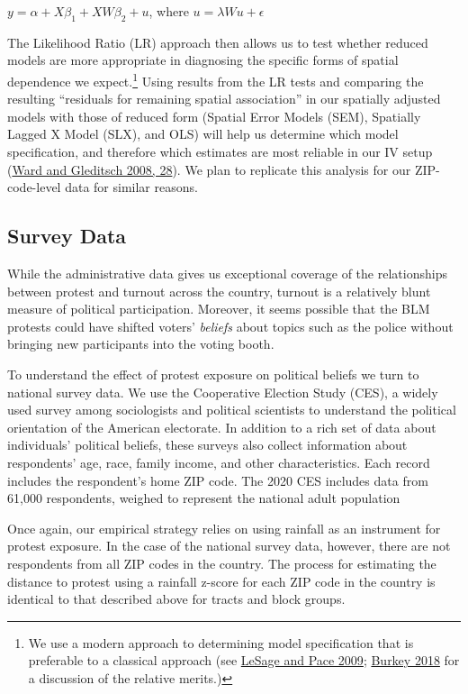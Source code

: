 \documentclass[
  12pt,
]{article}
\begin{document}
\(y = \alpha{} + X\beta_1{} + XW\beta_2{} + u\), where \(u = \lambda{Wu} + \epsilon{}\)

The Likelihood Ratio (LR) approach then allows us to test whether reduced models are more appropriate in diagnosing the specific forms of spatial dependence we expect.\footnote{We use a modern approach to determining model specification that is preferable to a classical approach (see \protect\hyperlink{ref-LeSage2009}{LeSage and Pace 2009}; \protect\hyperlink{ref-Burkey2018}{Burkey 2018} for a discussion of the relative merits.)} Using results from the LR tests and comparing the resulting ``residuals for remaining spatial association'' in our spatially adjusted models with those of reduced form (Spatial Error Models (SEM), Spatially Lagged X Model (SLX), and OLS) will help us determine which model specification, and therefore which estimates are most reliable in our IV setup (\protect\hyperlink{ref-Ward2008}{Ward and Gleditsch 2008, 28}). We plan to replicate this analysis for our ZIP-code-level data for similar reasons.

\hypertarget{survey-data}{%
\subsection*{Survey Data}\label{survey-data}}

While the administrative data gives us exceptional coverage of the relationships between protest and turnout across the country, turnout is a relatively blunt measure of political participation. Moreover, it seems possible that the BLM protests could have shifted voters' \emph{beliefs} about topics such as the police without bringing new participants into the voting booth.

To understand the effect of protest exposure on political beliefs we turn to national survey data. We use the Cooperative Election Study (CES), a widely used survey among sociologists and political scientists to understand the political orientation of the American electorate. In addition to a rich set of data about individuals' political beliefs, these surveys also collect information about respondents' age, race, family income, and other characteristics. Each record includes the respondent's home ZIP code. The 2020 CES includes data from 61,000 respondents, weighed to represent the national adult population

Once again, our empirical strategy relies on using rainfall as an instrument for protest exposure. In the case of the national survey data, however, there are not respondents from all ZIP codes in the country. The process for estimating the distance to protest using a rainfall z-score for each ZIP code in the country is identical to that described above for tracts and block groups.
\end{document}
